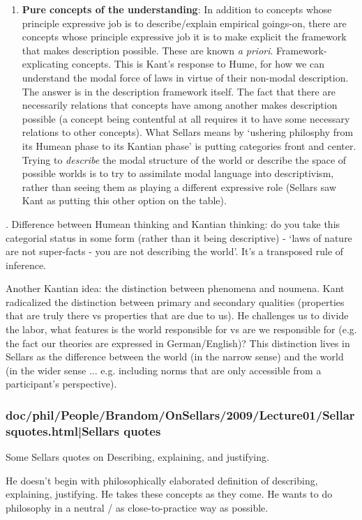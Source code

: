 \documentclass[12pt,a4paper]{report}
\begin{document}
\begin{enumerate}
\item \textbf{Pure concepts of the understanding}: In addition to concepts whose principle expressive job is to describe/explain empirical goings-on, there are concepts whose principle expressive job it is to make explicit the framework that makes description possible. These are known \textit{a priori}. Framework-explicating concepts. This is Kant's response to Hume, for how we can understand the modal force of laws in virtue of their non-modal description. The answer is in the description framework itself. The fact that there are necessarily relations that concepts have among another makes description possible (a concept being contentful at all requires it to have some necessary relations to other concepts). What Sellars means by `ushering philosphy from its Humean phase to its Kantian phase' is putting categories front and center. Trying to \emph{describe} the modal structure of the world or describe the space of possible worlds is to try to assimilate modal language into descriptivism, rather than seeing them as playing a different expressive role (Sellars saw Kant as putting this other option on the table).
\end{enumerate}. Difference between Humean thinking and Kantian thinking: do you take this categorial status in some form (rather than it being descriptive) - `laws of nature are not super-facts - you are not describing the world'. It's a transposed rule of inference.

Another Kantian idea: the distinction between phenomena and noumena. Kant radicalized the distinction between primary and secondary qualities (properties that are truly there vs properties that are due to us). He challenges us to divide the labor, what features is the world responsible for vs are we responsible for (e.g. the fact our theories are expressed in German/English)? This distinction lives in Sellars as the difference between the world (in the narrow sense) and the world (in the wider sense ... e.g. including norms that are only accessible from a participant's perspective).

\subsubsection{doc/phil/People/Brandom/OnSellars/2009/Lecture01/Sellarsquotes.html|Sellars quotes}
Some Sellars quotes on Describing, explaining, and justifying.

He doesn't begin with philosophically elaborated definition of describing, explaining, justifying. He takes these concepts as they come. He wants to do philosophy in a neutral / as close-to-practice way as possible.
\end{document}
